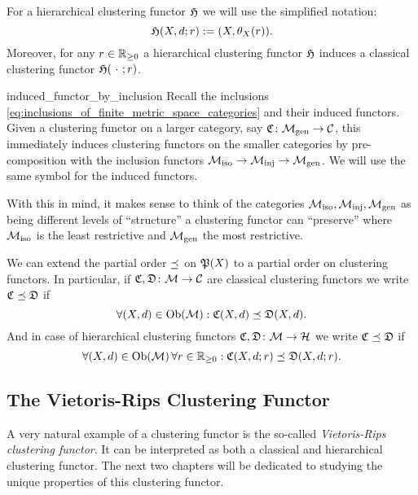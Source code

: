 For a hierarchical clustering functor $\Hf$ we will use the simplified notation:
$$
\Hf(X,d;r) := (X,\theta_X(r)).
$$
Moreover, for any $r \in \R_{\geq0}$ a hierarchical clustering functor $\Hf$ induces a classical clustering functor $\Hf(\ \cdot \ ;r)$.

\begin{myremark}{}{induced_functor_by_inclusion}
Recall the inclusions \eqref{eq:inclusions_of_finite_metric_space_categories} and their induced functors.
Given a clustering functor on a larger category, say $\Cf\colon \gen \to \C$, this immediately induces clustering functors on the smaller categories by pre-composition with the inclusion functors $\iso \to \inj \to \gen$. We will use the same symbol for the induced functors.
\end{myremark}

With this in mind, it makes sense to think of the categories $\iso, \inj, \gen$ as being different levels of ``structure'' a clustering functor can ``preserve'' where $\iso$ is the least restrictive and $\gen$ the most restrictive.


\begin{myremark}{}{}
We can extend the partial order $\refines$ on $\P(X)$ to a partial order on clustering functors.
In particular, if $\Cf, \mathfrak{D}\colon \M \to \C$ are classical clustering functors we write $\Cf \refines \mathfrak{D}$ if
\begin{equation*}
    \forall (X,d) \in \ob(\M): \Cf(X,d) \refines \mathfrak{D}(X,d).
\end{equation*}
And in case of hierarchical clustering functors $\Cf, \mathfrak{D}\colon \M \to \H$ we write $\Cf \refines \mathfrak{D}$ if
\begin{equation*}
    \forall (X,d) \in \ob(\M) \, \forall r \in \R_{\geq0}: \Cf(X,d;r) \refines \mathfrak{D}(X,d;r).
\end{equation*}
\end{myremark}


\subsection{The Vietoris-Rips Clustering Functor}

A very natural example of a clustering functor is the so-called \emph{Vietoris-Rips clustering functor}. It can be interpreted as both a classical and hierarchical clustering functor. The next two chapters will be dedicated to studying the unique properties of this clustering functor.

